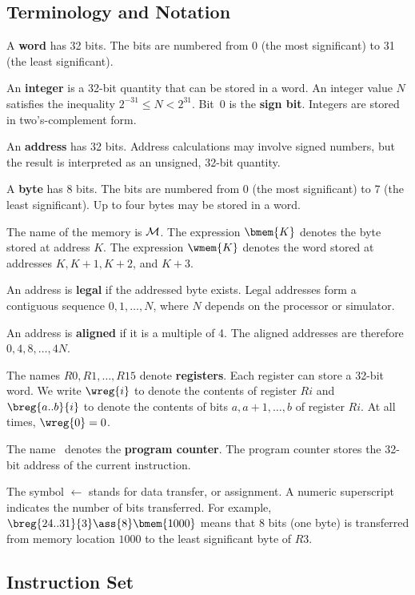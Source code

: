 \subsection{Terminology and Notation}

A {\bf word} has 32 bits. The bits are numbered from 0 (the most
significant) to 31 (the least significant).

An {\bf integer} is a 32-bit quantity that can be stored in a word.
An integer value $N$ satisfies the inequality $2^{-31} \le N < 2^{31}$.
Bit~0 is the {\bf sign bit}. Integers are stored in two's-complement
form.

An {\bf address} has 32 bits. Address calculations may involve signed
numbers, but the result is interpreted as an unsigned, 32-bit quantity.

A {\bf byte} has 8 bits. The bits are numbered from 0 (the most
significant) to 7 (the least significant). Up to four bytes may be stored
in a word.

The name of the memory is ${\cal M}$. The expression $\bmem{K}$ denotes
the byte stored at address $K$. The expression $\wmem{K}$ denotes the
word stored at addresses $K,K+1,K+2$, and $K+3$.

An address is {\bf legal} if the addressed byte exists. Legal addresses
form a contiguous sequence $0,1,\ldots,N$, where $N$ depends on the
processor or simulator.

An address is {\bf aligned} if it is a multiple of 4. The aligned
addresses are therefore $0,4,8,\ldots,4N$.

The names $R0,R1,\ldots,R15$ denote {\bf registers}. Each register can
store a 32-bit word. We write $\wreg{i}$ to denote the contents of
register $Ri$ and $\breg{a..b}{i}$ to denote the contents of bits
$a,a+1,\ldots,b$ of register $Ri$. At all times, $\wreg{0}=0$.

The name \ic\ denotes the {\bf program counter}. The program counter
stores the 32-bit address of the current instruction.

The symbol $\longleftarrow$ stands for data transfer, or assignment. A
numeric superscript indicates the number of bits transferred. For
example, $ \breg{24..31}{3} \ass{8} \bmem{1000} $ means that 8 bits (one
byte) is transferred from memory location $1000$ to the least
significant byte of $R3$.

\subsection{Instruction Set}

